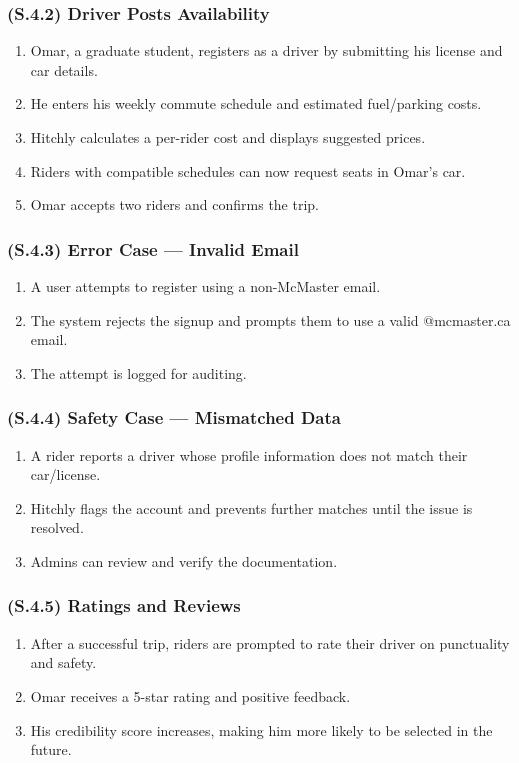 \documentclass[12pt,letterpaper]{article}
\begin{document}
\subsubsection{(S.4.2) Driver Posts Availability} %
\begin{enumerate}
    \item Omar, a graduate student, registers as a driver by submitting his license and car details.
    \item He enters his weekly commute schedule and estimated fuel/parking costs.
    \item Hitchly calculates a per-rider cost and displays suggested prices.
    \item Riders with compatible schedules can now request seats in Omar’s car.
    \item Omar accepts two riders and confirms the trip.
\end{enumerate}

\subsubsection{(S.4.3) Error Case — Invalid Email} %
\begin{enumerate}
    \item A user attempts to register using a non-McMaster email.
    \item The system rejects the signup and prompts them to use a valid @mcmaster.ca email.
    \item The attempt is logged for auditing.
\end{enumerate}

\subsubsection{(S.4.4) Safety Case — Mismatched Data} %
\begin{enumerate}
    \item A rider reports a driver whose profile information does not match their car/license.
    \item Hitchly flags the account and prevents further matches until the issue is resolved.
    \item Admins can review and verify the documentation.
\end{enumerate}

\subsubsection{(S.4.5) Ratings and Reviews} %
\begin{enumerate}
    \item After a successful trip, riders are prompted to rate their driver on punctuality and safety.
    \item Omar receives a 5-star rating and positive feedback.
    \item His credibility score increases, making him more likely to be selected in the future.
\end{enumerate}
\end{document}
